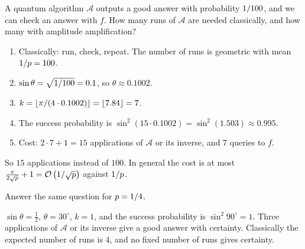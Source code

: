 \begin{exercisebox}
\begin{pproblem}[$p = 1/100$]\label{pp:amp100}
    A quantum algorithm $\mathcal{A}$ outputs a good answer with probability $1/100$, and we
    can check an answer with $f$. How many runs of $\mathcal{A}$ are needed classically, and how
    many with amplitude amplification?
\end{pproblem}
\tcblower
\begin{wsolution}
    \leavevmode
    \begin{enumerate}
        \item Classically: run, check, repeat. The number of runs is geometric with mean
              $1/p = 100$.
        \item $\sin\theta = \sqrt{1/100} = 0.1$, so $\theta \approx 0.1002$.
        \item $k = \floor{\sfrac{\pi}{(4 \cdot 0.1002)}} = \floor{7.84} = 7$.
        \item The success probability is $\sin^2(15 \cdot 0.1002) = \sin^2(1.503) \approx 0.995$.
        \item Cost: $2 \cdot 7 + 1 = 15$ applications of $\mathcal{A}$ or its inverse, and $7$
              queries to $f$.
    \end{enumerate}
    So $15$ applications instead of $100$. In general the cost is at most
    $\frac{\pi}{2\sqrt{p}} + 1 = \mathcal{O}\left(1/\sqrt{p}\right)$ against $1/p$.
\end{wsolution}
\end{exercisebox}

\begin{exercisebox}
\begin{pproblem}[$p = 1/4$]\label{pp:amp4}
    Answer the same question for $p = 1/4$.
\end{pproblem}
\tcblower
\begin{wsolution}
    $\sin\theta = \frac{1}{2}$, $\theta = 30^\circ$, $k = 1$, and the success probability is
    $\sin^2 90^\circ = 1$. Three applications of $\mathcal{A}$ or its inverse give a good answer
    with certainty. Classically the expected number of runs is $4$, and no fixed number of runs
    gives certainty.
\end{wsolution}
\end{exercisebox}

